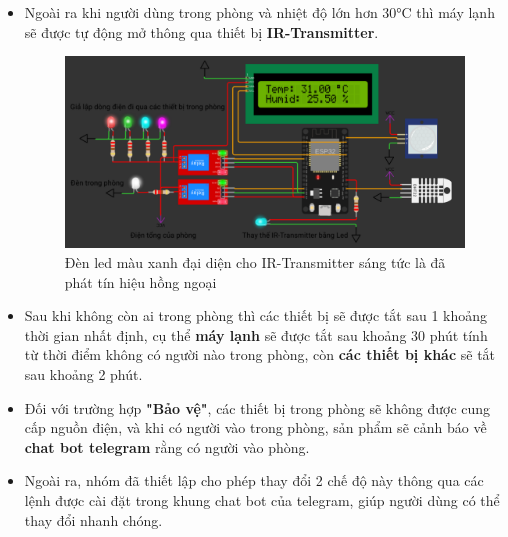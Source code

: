 \documentclass{report}
\begin{document}
\begin{itemize}
    \pagebreak
    \item Ngoài ra khi người dùng trong phòng và nhiệt độ lớn hơn 30°C thì máy lạnh sẽ được tự động mở thông qua thiết bị \textbf{IR-Transmitter}.

    \begin{figure}[!h]
        \centering
        \includegraphics[width=\textwidth, keepaspectratio]{mlanh_mo.png}
        \caption{Đèn led màu xanh đại diện cho IR-Transmitter sáng tức là đã phát tín hiệu hồng ngoại}
    \end{figure}

    \item Sau khi không còn ai trong phòng thì các thiết bị sẽ được tắt sau 1 khoảng thời gian nhất định, cụ thể  \textbf{máy lạnh} sẽ được tắt sau khoảng 30 phút tính từ thời điểm không có người nào trong phòng, còn \textbf{các thiết bị khác} sẽ tắt sau khoảng 2 phút.

    \item Đối với trường hợp \textbf{"Bảo vệ"}, các thiết bị trong phòng sẽ không được cung cấp nguồn điện, và khi có người vào trong phòng, sản phẩm sẽ cảnh báo về \textbf{chat bot telegram} rằng có người vào phòng.

    \item Ngoài ra, nhóm đã thiết lập cho phép thay đổi 2 chế độ này thông qua các lệnh được cài đặt trong khung chat bot của telegram, giúp người dùng có thể thay đổi nhanh chóng.
\end{itemize}


\newpage
\end{document}
